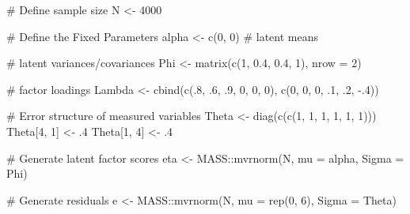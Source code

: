 \documentclass[
  letterpaper,
  DIV=11,
  numbers=noendperiod]{scrreprt}
\newenvironment{Shaded}{\begin{snugshade}}{\end{snugshade}}
\newcommand{\AttributeTok}[1]{\textcolor[rgb]{0.40,0.45,0.13}{#1}}
\newcommand{\CommentTok}[1]{\textcolor[rgb]{0.37,0.37,0.37}{#1}}
\newcommand{\DecValTok}[1]{\textcolor[rgb]{0.68,0.00,0.00}{#1}}
\newcommand{\FloatTok}[1]{\textcolor[rgb]{0.68,0.00,0.00}{#1}}
\newcommand{\FunctionTok}[1]{\textcolor[rgb]{0.28,0.35,0.67}{#1}}
\newcommand{\NormalTok}[1]{\textcolor[rgb]{0.00,0.23,0.31}{#1}}
\newcommand{\OtherTok}[1]{\textcolor[rgb]{0.00,0.23,0.31}{#1}}
\newcommand{\SpecialCharTok}[1]{\textcolor[rgb]{0.37,0.37,0.37}{#1}}
\begin{document}
\begin{Shaded}
\begin{Highlighting}[]
\CommentTok{\# Define sample size}
\NormalTok{N }\OtherTok{\textless{}{-}} \DecValTok{4000}

\CommentTok{\# Define the Fixed Parameters}
\NormalTok{alpha }\OtherTok{\textless{}{-}} \FunctionTok{c}\NormalTok{(}\DecValTok{0}\NormalTok{, }\DecValTok{0}\NormalTok{)  }\CommentTok{\# latent means}

\CommentTok{\# latent variances/covariances}
\NormalTok{Phi }\OtherTok{\textless{}{-}} \FunctionTok{matrix}\NormalTok{(}\FunctionTok{c}\NormalTok{(}\DecValTok{1}\NormalTok{, }\FloatTok{0.4}\NormalTok{, }
                \FloatTok{0.4}\NormalTok{, }\DecValTok{1}\NormalTok{), }\AttributeTok{nrow =} \DecValTok{2}\NormalTok{)  }

\CommentTok{\# factor loadings}
\NormalTok{Lambda }\OtherTok{\textless{}{-}} \FunctionTok{cbind}\NormalTok{(}\FunctionTok{c}\NormalTok{(.}\DecValTok{8}\NormalTok{, .}\DecValTok{6}\NormalTok{, .}\DecValTok{9}\NormalTok{, }\DecValTok{0}\NormalTok{, }\DecValTok{0}\NormalTok{, }\DecValTok{0}\NormalTok{), }
                \FunctionTok{c}\NormalTok{(}\DecValTok{0}\NormalTok{, }\DecValTok{0}\NormalTok{, }\DecValTok{0}\NormalTok{, .}\DecValTok{1}\NormalTok{, .}\DecValTok{2}\NormalTok{, }\SpecialCharTok{{-}}\NormalTok{.}\DecValTok{4}\NormalTok{))  }

\CommentTok{\# Error structure of measured variables}
\NormalTok{Theta }\OtherTok{\textless{}{-}} \FunctionTok{diag}\NormalTok{(}\FunctionTok{c}\NormalTok{(}\FunctionTok{c}\NormalTok{(}\DecValTok{1}\NormalTok{, }\DecValTok{1}\NormalTok{, }\DecValTok{1}\NormalTok{, }\DecValTok{1}\NormalTok{, }\DecValTok{1}\NormalTok{, }\DecValTok{1}\NormalTok{)))}
\NormalTok{Theta[}\DecValTok{4}\NormalTok{, }\DecValTok{1}\NormalTok{] }\OtherTok{\textless{}{-}}\NormalTok{ .}\DecValTok{4}
\NormalTok{Theta[}\DecValTok{1}\NormalTok{, }\DecValTok{4}\NormalTok{] }\OtherTok{\textless{}{-}}\NormalTok{ .}\DecValTok{4}

\CommentTok{\# Generate latent factor scores}
\NormalTok{eta }\OtherTok{\textless{}{-}}\NormalTok{ MASS}\SpecialCharTok{::}\FunctionTok{mvrnorm}\NormalTok{(N, }\AttributeTok{mu =}\NormalTok{ alpha, }\AttributeTok{Sigma =}\NormalTok{ Phi)}

\CommentTok{\# Generate residuals}
\NormalTok{e }\OtherTok{\textless{}{-}}\NormalTok{ MASS}\SpecialCharTok{::}\FunctionTok{mvrnorm}\NormalTok{(N, }\AttributeTok{mu =} \FunctionTok{rep}\NormalTok{(}\DecValTok{0}\NormalTok{, }\DecValTok{6}\NormalTok{), }\AttributeTok{Sigma =}\NormalTok{ Theta)}


\end{Highlighting}
\end{Shaded}
\end{document}

